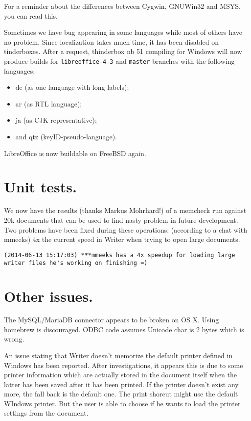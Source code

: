 \documentclass{article}
\begin{document}
For a reminder about the differences between Cygwin, GNUWin32 and MSYS, you can read this\cite{winBuildCygwinMsysGnuWin32Comparison}.

Sometimes we have bug appearing in some languages while most of others have no problem. Since localization takes much time, it has been disabled on tinderboxes. After a request, thinderbox nb 51 compiling for Windows will now produce builds for \lstinline{libreoffice-4-3} and \lstinline{master} branches with the following languages:
\begin{itemize}
    \item de (as one language with long labels);
    \item ar (as RTL language);
    \item ja (as CJK representative);
    \item and qtz (keyID-pseudo-language).
\end{itemize}

LibreOffice is now buildable on FreeBSD again\cite{freeBsdBuild1}\cite{freeBsdBuild2}.

\section{Unit tests.}

We now have the results (thanks Markus Mohrhard!) of a memcheck run against 20k documents that can
be used to find nasty problem in future development\cite{memcheckTests}. Two problems
have been fixed during these operations: (according to a chat with
mmeeks) 4x the current speed in Writer when trying to open large documents.

\begin{lstlisting}
(2014-06-13 15:17:03) ***mmeeks has a 4x speedup for loading large writer files he's working on finishing =)
\end{lstlisting}

\section{Other issues.}

The MySQL/MariaDB connector appears to be broken on OS X. Using homebrew
is discouraged. ODBC code assumes Unicode char is 2 bytes which is wrong\cite{sqlConnectorOsx1}\cite{sqlConnectorOsx2}.

An issue stating that Writer doesn't memorize the default printer
defined in Windows has been reported. After investigations, it
appears this is due to some printer information which are
actually stored in the document itself when the latter has been saved
after it has been printed. If the printer doesn't exist any more, the
fall back is the default one\cite{writerPrinter1}. The print shorcut might use the
default WIndows printer\cite{writerPrinter2}. But the user is able to choose if he wants
to load the printer settings from the document\cite{writerPrinter3}.
\end{document}
